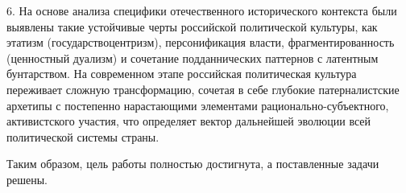 6. На основе анализа специфики отечественного исторического контекста были выявлены такие устойчивые черты российской политической культуры, как этатизм (государствоцентризм), персонификация власти, фрагментированность (ценностный дуализм) и сочетание подданнических паттернов с латентным бунтарством. На современном этапе российская политическая культура переживает сложную трансформацию, сочетая в себе глубокие патерналистские архетипы с постепенно нарастающими элементами рационально-субъектного, активистского участия, что определяет вектор дальнейшей эволюции всей политической системы страны.

Таким образом, цель работы полностью достигнута, а поставленные задачи решены.